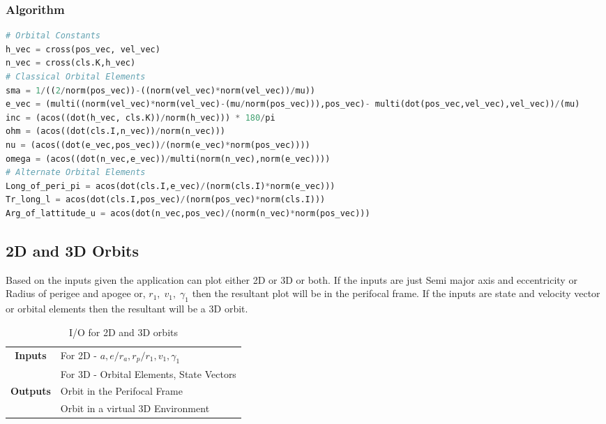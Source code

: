 \documentclass[12pt]{article}
\begin{document}
\subsubsection{Algorithm}
\begin{lstlisting}[language=python, caption=Calculation of Orbital Elements]
# Orbital Constants
h_vec = cross(pos_vec, vel_vec)
n_vec = cross(cls.K,h_vec)
# Classical Orbital Elements
sma = 1/((2/norm(pos_vec))-((norm(vel_vec)*norm(vel_vec))/mu))
e_vec = (multi((norm(vel_vec)*norm(vel_vec)-(mu/norm(pos_vec))),pos_vec)- multi(dot(pos_vec,vel_vec),vel_vec))/(mu)
inc = (acos((dot(h_vec, cls.K))/norm(h_vec))) * 180/pi
ohm = (acos((dot(cls.I,n_vec))/norm(n_vec)))
nu = (acos((dot(e_vec,pos_vec))/(norm(e_vec)*norm(pos_vec))))
omega = (acos((dot(n_vec,e_vec))/multi(norm(n_vec),norm(e_vec))))
# Alternate Orbital Elements
Long_of_peri_pi = acos(dot(cls.I,e_vec)/(norm(cls.I)*norm(e_vec)))
Tr_long_l = acos(dot(cls.I,pos_vec)/(norm(pos_vec)*norm(cls.I)))
Arg_of_lattitude_u = acos(dot(n_vec,pos_vec)/(norm(n_vec)*norm(pos_vec)))
\end{lstlisting}

\subsection{2D and 3D Orbits}

Based on the inputs given the application can plot either 2D or 3D or both. If the inputs are just Semi major axis and eccentricity or Radius of perigee and apogee or, $r_1,\;v_1,\;\gamma_1$ then the resultant plot will be in the perifocal frame. If the inputs are state and velocity vector or orbital elements then the resultant will be a 3D orbit. 
\begin{table}[H]
\centering
\begin{tabular}{@{}cl@{}}
\toprule
\multirow{2}{*}{\textbf{Inputs}}                      & For 2D - $a,e/r_a,r_p/ r_1, v_1, \gamma_1$ \\ \cmidrule(l){2-2} 
                                             & For 3D - Orbital Elements, State Vectors   \\ \midrule
\multicolumn{1}{r}{\multirow{2}{*}{\textbf{Outputs}}} & Orbit in the Perifocal Frame               \\ \cmidrule(l){2-2} 
\multicolumn{1}{r}{}                         & Orbit in a virtual 3D Environment          \\ \bottomrule
\end{tabular}
\caption{I/O for 2D and 3D orbits}
\label{o23}
\end{table}
\end{document}
